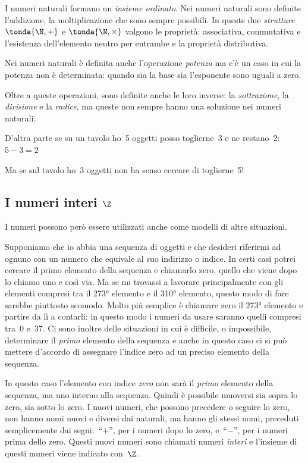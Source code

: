 I numeri naturali formano un \emph{insieme ordinato}.
Nei numeri naturali sono definite l'addizione, la moltiplicazione che sono 
sempre possibili. In queste due \emph{strutture} \(\tonda{\N, +}\) e 
\(\tonda{\N, \times}\) valgono le proprietà: associativa, commutativa e 
l'esistenza dell'elemento neutro per entrambe e la proprietà distributiva.

Nei numeri naturali è definita anche l'operazione \emph{potenza} ma c'è un caso 
in cui la potenza non è determinata: quando sia la base sia l'esponente sono 
uguali a zero.

Oltre a queste operazioni, sono definite anche le loro inverse: la 
\emph{sottrazione}, la \emph{divisione} e la \emph{radice}, ma queste non sempre 
hanno una soluzione nei numeri naturali.

D'altra parte se su un tavolo ho~5 oggetti posso toglierne~3 e ne restano~2: 
\(5-3=2\)

Ma se sul tavolo ho~3 oggetti non ha senso cercare di toglierne~5!

\subsection{I numeri interi \(\Z\)} 
\label{subsec:insnum_interi}

I numeri possono però essere utilizzati anche come modelli di altre situazioni. 

Supponiamo che io abbia una sequenza di oggetti e che desideri riferirmi ad ognuno
con un numero che equivale al suo indirizzo o indice. In certi casi potrei cercare
il primo elemento della sequenza e chiamarlo zero, quello che viene dopo lo chiamo 
uno e così via. Ma se mi trovassi a lavorare principalmente con gli elementi 
compresi tra il 273° elemento e il 310° elemento, questo modo di fare sarebbe 
piuttosto scomodo. Molto più semplice è chiamare zero il 273° elemento e 
partire da lì a contarli: in questo modo i numeri da usare saranno quelli 
compresi tra~0 e~37. 
Ci sono inoltre delle situazioni in cui è difficile, 
o impossibile, determinare il \emph{primo} elemento della sequenza e anche in 
questo caso ci si può mettere d'accordo di assegnare l'indice zero ad un preciso 
elemento della sequenza.

In questo caso l'elemento con indice \emph{zero} non sarà il \emph{primo} 
elemento della sequenza, ma uno interno alla sequenza. Quindi è possibile
muoversi sia sopra lo zero, sia sotto lo zero. I nuovi numeri, che possono 
precedere o seguire lo zero, non hanno nomi nuovi e diversi dai naturali, ma 
hanno gli stessi nomi, preceduti semplicemente dai segni:~``\(+\)'', per 
i numeri dopo lo zero, e~``\(-\)'', per i numeri prima dello zero. Questi nuovi 
numeri sono chiamati numeri \emph{interi} e l'insieme di questi numeri viene 
indicato con~\(\Z\).

